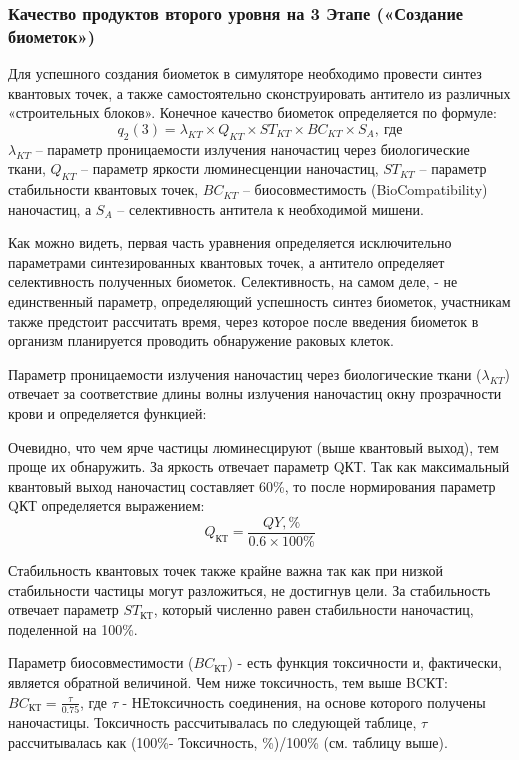 \subsubsection*{Качество продуктов второго уровня на 3 Этапе («Создание биометок»)}

Для успешного создания биометок в симуляторе необходимо провести синтез квантовых точек, а также самостоятельно сконструировать антитело из различных «строительных блоков». Конечное качество биометок определяется по формуле:
$$q_2 (3)=\lambda_{KT} \times Q_{KT} \times ST_{KT} \times BC_{KT} \times S_A, \: \text{где}$$
$\lambda_{KT}$ – параметр проницаемости излучения наночастиц через биологические ткани, $Q_{KT}$ – параметр яркости люминесценции наночастиц, $ST_{KT}$ – параметр стабильности квантовых точек, $BC_{KT}$ – биосовместимость (BioCompatibility) наночастиц, а $S_A$ – селективность антитела к необходимой мишени.

Как можно видеть, первая часть уравнения определяется исключительно параметрами синтезированных квантовых точек, а антитело определяет селективность полученных биометок. Селективность, на самом деле, - не единственный параметр, определяющий успешность синтез биометок, участникам также предстоит рассчитать время, через которое после введения биометок в организм планируется проводить обнаружение раковых клеток.

Параметр проницаемости излучения наночастиц через биологические ткани ($\lambda_{KT}$) отвечает за соответствие длины волны излучения наночастиц окну прозрачности крови и определяется функцией:

 
Очевидно, что чем ярче частицы люминесцируют (выше квантовый выход), тем проще их обнаружить. За яркость отвечает параметр QКТ. Так как максимальный квантовый выход наночастиц составляет 60\%, то после нормирования параметр QКТ определяется выражением:
$$Q_{КТ}=\frac{QY,\%}{0.6\times 100\%}$$

Стабильность квантовых точек также крайне важна так как при низкой стабильности частицы могут разложиться, не достигнув цели. За стабильность отвечает параметр $ST_{КТ}$, который численно равен стабильности наночастиц, поделенной на 100\%.

Параметр биосовместимости ($BC_{КТ}$) - есть функция токсичности и, фактически, является обратной величиной. Чем ниже токсичность, тем выше BCКТ: $BC_{КТ}=\frac{\tau}{0.75}$, где $\tau$ - НЕтоксичность соединения, на основе которого получены наночастицы. Токсичность рассчитывалась по следующей таблице, $\tau$ рассчитывалась как (100\%- Токсичность, \%)/100\% (см. таблицу выше).

